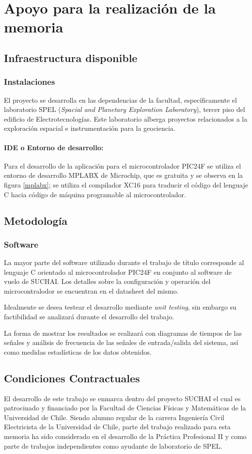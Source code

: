 \documentclass[11pt,letterpaper]{article}
\begin{document}
\section{Apoyo para la realización de la memoria}
\subsection{Infraestructura disponible}

\subsubsection{Instalaciones}
El proyecto se desarrolla en las dependencias de la facultad, específicamente el laboratorio SPEL (\textit{Spacial and Planetary Exploration Laboratory}), tercer piso del edificio de Electrotecnologías. Este laboratorio alberga proyectos relacionados a la exploración espacial e instrumentación para la geociencia.

\paragraph{IDE o Entorno de desarrollo:}
Para el desarrollo de la aplicación para el microcontrolador PIC24F se utiliza el entorno de desarrollo MPLABX de Microchip, que es gratuita y se observa en la figura \ref{mplabx}; se utiliza el compilador XC16 para traducir el código del lenguaje C hacia código de máquina programable al microcontrolador.

\subsection{Metodología}
\subsubsection{Software}
La mayor parte del software utilizado durante el trabajo de título corresponde al lenguaje C orientado al microcontrolador PIC24F en conjunto al software de vuelo de SUCHAI. Los detalles sobre la configuración y operación del microcontralodor se encuentran en el datasheet del mismo.

Idealmente se desea testear el desarrollo mediante \textit{unit testing}, sin embargo su factibilidad se analizará durante el desarrollo del trabajo.

La forma de mostrar los resultados se realizará con diagramas de tiempos de las señales y análisis de frecuencia de las señales de entrada/salida del sistema, así como medidas estadísticas  de los datos obtenidos.



\subsection{Condiciones Contractuales} 
El desarrollo de este trabajo se enmarca dentro del proyecto SUCHAI el cual es patrocinado y financiado por la Facultad de Ciencias Físicas y Matemáticas de la Universidad de Chile. Siendo alumno regular de la carrera Ingeniería Civil Electricista de la Universidad de Chile, parte del trabajo realizado para esta memoria ha sido considerado en el desarrollo de la Práctica Profesional II y como parte de trabajos independientes como ayudante de laboratorio de SPEL.
\end{document}
